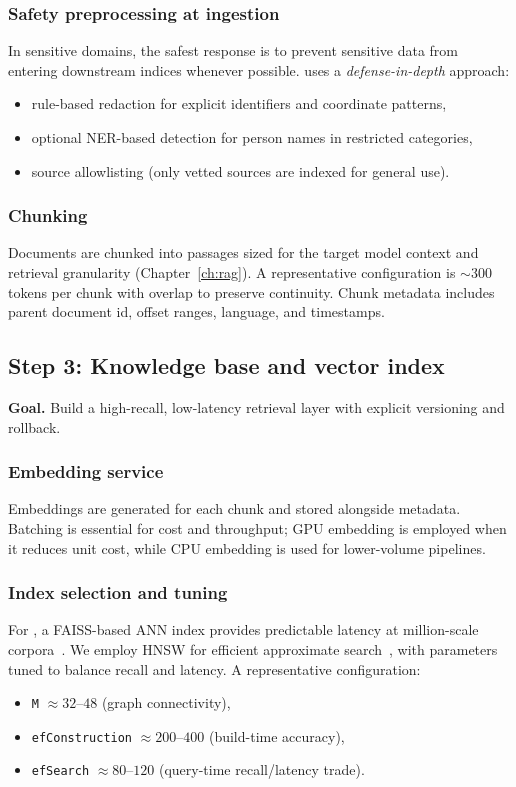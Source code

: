 \subsubsection{Safety preprocessing at ingestion}
In sensitive domains, the safest response is to prevent sensitive data from entering downstream indices whenever possible.
\ishtar{} uses a \emph{defense-in-depth} approach:
\begin{itemize}
    \item rule-based redaction for explicit identifiers and coordinate patterns,
    \item optional NER-based detection for person names in restricted categories,
    \item source allowlisting (only vetted sources are indexed for general use).
\end{itemize}

\subsubsection{Chunking}
Documents are chunked into passages sized for the target model context and retrieval granularity (Chapter~\ref{ch:rag}).
A representative configuration is $\sim$300 tokens per chunk with overlap to preserve continuity.
Chunk metadata includes parent document id, offset ranges, language, and timestamps.

\subsection{Step 3: Knowledge base and vector index}
\label{sec:ishtar-step-kb}

\textbf{Goal.} Build a high-recall, low-latency retrieval layer with explicit versioning and rollback.

\subsubsection{Embedding service}
Embeddings are generated for each chunk and stored alongside metadata.
Batching is essential for cost and throughput; GPU embedding is employed when it reduces unit cost, while CPU embedding is used for lower-volume pipelines.

\subsubsection{Index selection and tuning}
For \ishtar{}, a FAISS-based ANN index provides predictable latency at million-scale corpora~\cite{johnson2019billion}.
We employ HNSW for efficient approximate search~\cite{Malkov2018HNSW}, with parameters tuned to balance recall and latency.
A representative configuration:
\begin{itemize}
    \item \texttt{M} $\approx 32$--$48$ (graph connectivity),
    \item \texttt{efConstruction} $\approx 200$--$400$ (build-time accuracy),
    \item \texttt{efSearch} $\approx 80$--$120$ (query-time recall/latency trade).
\end{itemize}

